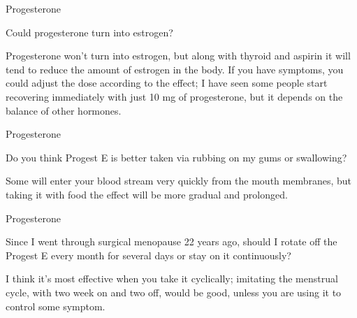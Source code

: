 \documentclass[11pt,oneside,openany,extrafontsizes]{memoir}
\begin{document}
\begin{qaexchange}{Progesterone}

    \begin{question}
        Could progesterone turn into estrogen?
    \end{question}

    \begin{answer}
        Progesterone won't turn into estrogen, but along with thyroid and aspirin it will tend to reduce the amount of estrogen in the body. If you have symptoms, you could adjust the dose according to the effect; I have seen some people start recovering immediately with just 10 mg of progesterone, but it depends on the balance of other hormones.
    \end{answer}
\end{qaexchange}

\begin{qaexchange}{Progesterone}

    \begin{question}
        Do you think Progest E is better taken via rubbing on my gums or swallowing?
    \end{question}

    \begin{answer}
        Some will enter your blood stream very quickly from the mouth membranes, but taking it with food the effect will be more gradual and prolonged.
    \end{answer}
\end{qaexchange}

\begin{qaexchange}{Progesterone}

    \begin{question}
        Since I went through surgical menopause 22 years ago, should I rotate off the Progest E every month for several days or stay on it continuously?
    \end{question}

    \begin{answer}
        I think it's most effective when you take it cyclically; imitating the menstrual cycle, with two week on and two off, would be good, unless you are using it to control some symptom.
    \end{answer}
\end{qaexchange}
\end{document}
